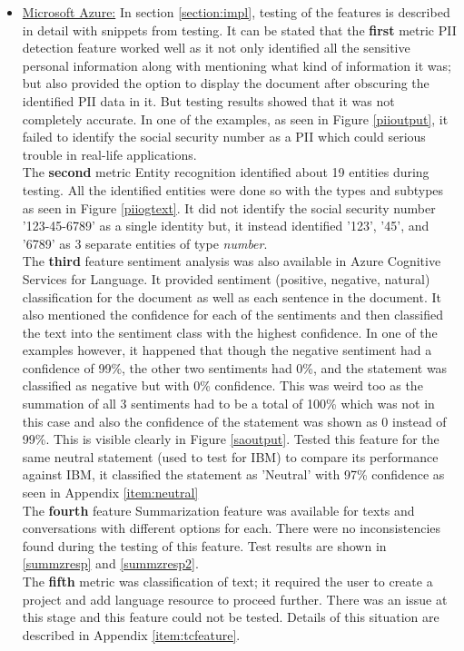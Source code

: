 \begin{itemize}
    \item \underline{Microsoft Azure:} 
    In section \ref{section:impl}, testing of the features is described in detail with snippets from testing. It can be stated that the \textbf{first} metric \acs{PII} detection feature worked well as it not only identified all the sensitive personal information along with mentioning what kind of information it was; but also provided the option to display the document after obscuring the identified \acs{PII} data in it. But testing results showed that it was not completely accurate. In one of the examples, as seen in Figure \ref{piioutput}, it failed to identify the social security number as a \acs{PII} which could serious trouble in real-life applications.\\
    The \textbf{second} metric Entity recognition identified about 19 entities during testing. All the identified entities were done so with the types and subtypes as seen in Figure \ref{piiogtext}. It did not identify the social security number '123-45-6789' as a single identity but, it instead identified '123', '45', and '6789' as 3 separate entities of type \textit{number}. \\ 
    The \textbf{third} feature sentiment analysis was also available in Azure Cognitive Services for Language. It provided sentiment (positive, negative, natural) classification for the document as well as each sentence in the document. It also mentioned the confidence for each of the sentiments and then classified the text into the sentiment class with the highest confidence. In one of the examples however, it happened that though the negative sentiment had a confidence of 99\%, the other two sentiments had 0\%, and the statement was classified as negative but with 0\% confidence. This was weird too as the summation of all 3 sentiments had to be a total of 100\% which was not in this case and also the confidence of the statement was shown as 0 instead of 99\%. This is visible clearly in Figure \ref{saoutput}. Tested this feature for the same neutral statement (used to test for IBM) to compare its performance against IBM, it classified the statement as 'Neutral' with 97\% confidence as seen in Appendix \ref{item:neutral}\\
    The \textbf{fourth} feature Summarization feature was available for texts and conversations with different options for each. There were no inconsistencies found during the testing of this feature. Test results are shown in \ref{summzresp} and \ref{summzresp2}.\\
    The \textbf{fifth} metric was classification of text; it required the user to create a project and add language resource to proceed further. There was an issue at this stage and this feature could not be tested. Details of this situation are described in Appendix \ref{item:tcfeature}.\\

\end{itemize}
